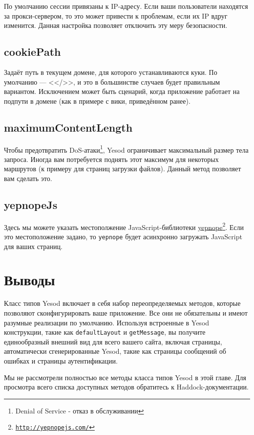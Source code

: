 По умолчанию сессии привязаны к IP-адресу. Если ваши пользователи находятся за прокси-сервером, то это может привести к проблемам, если их IP вдруг изменится. Данная настройка позволяет отключить эту меру безопасности.

\subsection {cookiePath}

Задаёт путь в текущем домене, для которого устанавливаются куки. По умолчанию --- <</>>, и это в большинстве случаев будет правильным вариантом. Исключением может быть сценарий, когда приложение работает на подпути в домене (как в примере с вики, приведённом ранее).

\subsection {maximumContentLength}

Чтобы предотвратить DoS-атаки\footnote{Denial of Service - отказ в обслуживании}, Yesod ограничивает максимальный размер тела запроса.  Иногда вам потребуется поднять этот максимум для некоторых маршрутов (к примеру для страниц загрузки файлов). Данный метод позволяет вам сделать это.

\subsection {yepnopeJs}

Здесь мы можете указать местополжение JavaScript-библиотеки \href{http://yepnopejs.com/}{yepnope}\footnote{\href{http://yepnopejs.com/}{\texttt{http://yepnopejs.com/}}}. Если это местоположение задано, то \lstinline!yepnope! будет асинхронно загружать JavaScript для ваших страниц.

\section {Выводы}

Класс типов Yesod включает в себя набор переопределяемых методов, которые позволяют сконфигурировать ваше приложение. Все они не обязательны и имеют разумные реализации по умолчанию. Используя встроенные в Yesod конструкции, такие как \lstinline!defaultLayout! и \lstinline!getMessage!, вы получите единообразный внешний вид для всего вашего сайта, включая страницы, автоматически сгенерированные Yesod, такие как страницы сообщений об ошибках и страницы аутентификации.

Мы не рассмотрели полностью все методы класса типов Yesod в этой главе. Для просмотра всего списка доступных методов обратитесь к Haddock-документации.
